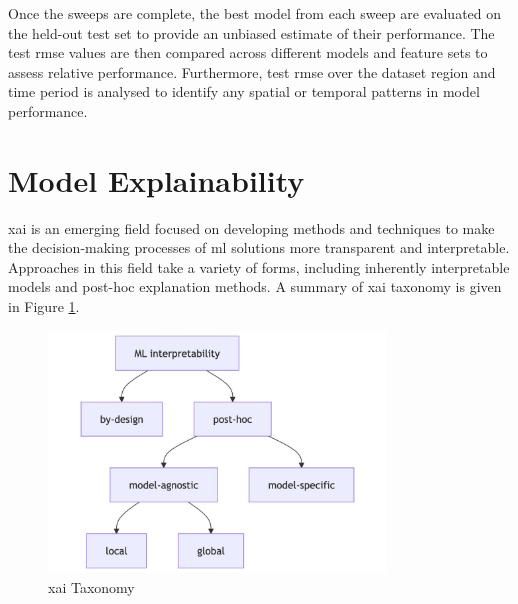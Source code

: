 Once the sweeps are complete, the best model from each sweep are evaluated on the held-out test set to provide an unbiased estimate of their performance. The test \acrshort{rmse} values are then compared across different models and feature sets to assess relative performance. Furthermore, test \acrshort{rmse} over the dataset region and time period is analysed to identify any spatial or temporal patterns in model performance. 

\section{Model Explainability}

\acrfull{xai} is an emerging field focused on developing methods and techniques to make the decision-making processes of \acrshort{ml} solutions more transparent and interpretable. Approaches in this field take a variety of forms, including inherently interpretable models and post-hoc explanation methods. A summary of \acrshort{xai} taxonomy is given in Figure \ref{fig:xai-taxonomy}.

\begin{figure}[ht]
    \centering
    \includegraphics[width=0.8\textwidth]{../figures/static/xai-taxonomy.jpg}
    \caption{\acrshort{xai} Taxonomy \citep{Molnar2025}}
    \label{fig:xai-taxonomy}
\end{figure}

